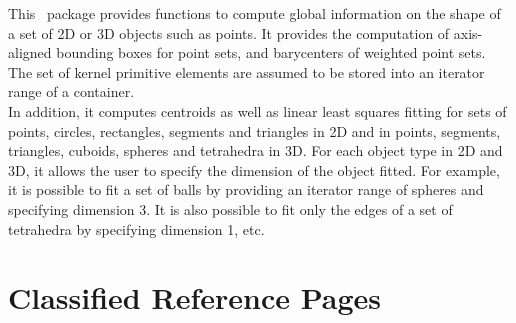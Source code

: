 


This \cgal\ package provides functions to compute global information on the shape of a set of 2D or 3D objects such as points. It provides the computation of axis-aligned bounding boxes for point sets, and barycenters of weighted point sets. The set of kernel primitive elements are assumed to be stored into an iterator range of a container.\\

In addition, it computes centroids as well as linear least squares fitting for sets of points, circles, rectangles, segments and triangles in 2D and in points, segments, triangles, cuboids, spheres and tetrahedra in 3D. For each object type in 2D and 3D, it allows the user to specify the dimension of the object fitted. For example, it is possible to fit a set of balls by providing an iterator range of spheres and specifying dimension 3. It is also possible to fit only the edges of a set of tetrahedra by specifying dimension 1, etc.

\section{Classified Reference Pages}


\\
\\
\\
\\


\\
\\
\\
\\
\\

